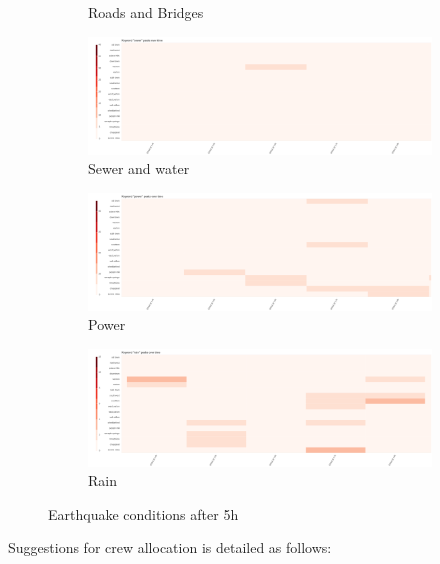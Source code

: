 \begin{figure}[!h]
\begin{subfigure}[!h]{0.32\textwidth}
        \caption{Roads and Bridges}
        \label{fig:road_5h}
    \end{subfigure}
    \begin{subfigure}[!h]{0.32\textwidth}
        \centering
        \includegraphics[width=1.00\textwidth]{figs/cond_5h/cond_5h_sewer.png}
        \caption{Sewer and water}
        \label{fig:sewer_5h}
    \end{subfigure}
    \begin{subfigure}[!h]{0.32\textwidth}
        \centering
        \includegraphics[width=1.00\textwidth]{figs/cond_5h/cond_5h_power.png}
        \caption{Power}
        \label{fig:power_5h}
    \end{subfigure}
    \begin{subfigure}[!h]{0.32\textwidth}
        \centering
        \includegraphics[width=1.00\textwidth]{figs/cond_5h/cond_5h_rain.png}
        \caption{Rain}
        \label{fig:rain_5h}
    \end{subfigure}
    \caption{Earthquake conditions after 5h}
    \label{fig:eq_cond_5h}
\end{figure}

Suggestions for crew allocation is detailed as follows: 

